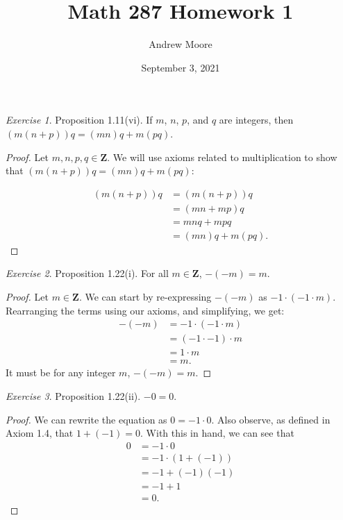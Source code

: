 \documentclass[12pt,oneside]{amsart}
\title{Math 287 Homework 1}
\author{Andrew Moore}
\date{September 3, 2021} %
\theoremstyle{remark}
\newtheorem{exer}{Exercise}
\begin{document}
\maketitle

\newpage
\begin{exer}
Proposition 1.11(vi). If $m$, $n$, $p$, and $q$ are integers, then \newline
$(m(n+p))q = (mn)q + m(pq)$.
\end{exer}

\begin{proof}
Let $m, n, p, q \in \mathbf{Z}.$ We will use axioms related to multiplication to show that $(m(n + p))q = (mn)q + m(pq):$

\begin{align*}
(m(n + p))q &= (m(n + p))q \\
            &= (mn + mp)q \tag{Axiom 1.1.3} \\
            &= mnq + mpq \tag{Axiom 1.1.3} \\
            &= (mn)q + m(pq). \tag{Axiom 1.1.5}
\end{align*}
\end{proof}

\newpage
\begin{exer}
Proposition 1.22(i). For all $m \in \mathbf{Z}$, $-(-m) = m$.
\end{exer}

\begin{proof}
Let $m \in \mathbf{Z}$. We can start by re-expressing $-(-m)$ as $-1 \cdot (-1 \cdot m)$. Rearranging the terms using our axioms, and simplifying, we get:
\begin{align*}
-(-m) &= -1 \cdot (-1 \cdot m) \\
      &= (-1 \cdot -1) \cdot m \tag{Axiom 1.1.4} \\
      &= 1 \cdot m \tag{Corollary 1.21} \\
      &= m. \tag{Axiom 1.3}
\end{align*}
It must be for any integer $m$, $-(-m) = m$.
\end{proof}

\newpage
\begin{exer}
Proposition 1.22(ii). $-0 = 0$.
\end{exer}

\begin{proof}
We can rewrite the equation as $0 = -1 \cdot 0$. Also observe, as defined in Axiom 1.4, that $1 + (-1) = 0$. With this in hand, we can see that
\begin{align*}
0 &= -1 \cdot 0 \\
  &= -1 \cdot (1 + (-1)) \tag{Replacement} \\
  &= -1 + (-1)(-1) \tag{Axiom 1.1.3} \\
  &= -1 + 1 \tag{Simplifying, using Corollary 1.21} \\
  &= 0.
\end{align*}
\end{proof}
\end{document}
